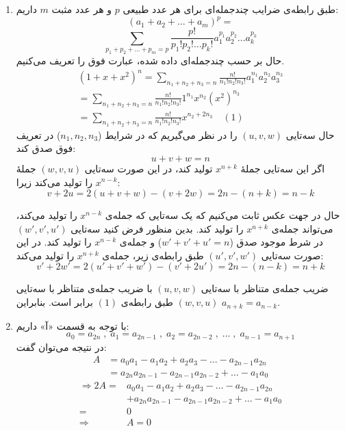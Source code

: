 	\begin{enumerate}
		\item 
        \p
        طبق رابطه‌ی ضرایب چندجمله‌ای برای هر عدد
         طبیعی 
         $p$
         و هر عدد مثبت 
         $m$ 
          داریم:
        $$(a_1+a_2+\ldots+a_m)^p = $$
        $$\sum_{p_1+p_2+\ldots+p_m=p} \frac{p!}{p_1!p_2!\ldots p_k!} a_1^{p_1}a_2^{p_2}\ldots a_k^{p_k}$$
        حال بر حسب چندجمله‌ای داده ‌شده، عبارت فوق را تعریف می‌کنیم.
        \begin{align*}
		(1+x+x^2)^n = \sum_{n_1+n_2+n_3=n} \frac{n!}{n_1!n_2!n_3!} a_1^{n_1} a_2^{n_2} a_3^{n_3}\\
		= \sum_{n_1+n_2+n_3=n} \frac{n!}{n_1!n_2!n_3!} 1^{n_1} x^{n_2} (x^2)^{n_3}\\
		= \sum_{n_1+n_2+n_3=n} \frac{n!}{n_1!n_2!n_3!} x^{n_2 + 2n_3}  \quad (1)
        \end{align*}
		حال سه‌تایی
         $(u , v , w)$
         را در نظر می‌گیریم که در شرایط 
         ($n_1 , n_2 , n_3$)
       در تعریف فوق صدق کند:
       $$u + v + w = n$$
        اگر این سه‌تایی  جملهٔ $x^{n + k}$ تولید کند، در این صورت سه‌تایی $(w , v , u)$ جملهٔ $x^{n - k}$ را تولید می‌کند زیرا:
        $$v + 2u = 2(u + v + w) - (v + 2w) = 2n - (n + k) = n -k$$
        
        \p
        حال در جهت عکس ثابت می‌کنیم که یک سه‌تایی که جمله‌ی
        $x^{n-k}$
        را تولید می‌کند، می‌تواند جمله‌ی
        $x^{n+k}$
        را تولید کند. بدین منظور فرض کنید سه‌تایی
        $(w', v', u')$
        در شرط موجود صدق 
        ($w' + v' + u'=n$)
        و جمله‌ی
        $x^{n-k}$
        را تولید کند.
        در این صورت سه‌تایی
        $(u',v',w')$
        طبق رابطه‌ی زیر، جمله‌ی 
        $x^{n+k}$
        را تولید می‌کند:
    	$$v' + 2w' = 2(u' + v' + w') - (v' + 2u') = 2n - (n - k) = n +k$$
	
        \p
    	 ضریب جمله‌ی متناظر با سه‌تایی 
        $(u , v , w)$ 
        با ضریب جمله‌ی متناظر با سه‌تایی 
        $(w , v , u)$
         طبق رابطه‌ی $(1)$ برابر است. بنابراین 
         $a_{n + k} = a_{n - k}$.
	
	\item
        \p
          با توجه به قسمت  
          «آ»
          داریم:
    	$$a_0 = a_{2n} \; ,\; a_1 = a_{2n - 1}\; ,\; a_2 = a_{2n - 2}\; ,\; \dots \; ,\; a_{n - 1} = a_{n + 1}$$
        در نتیجه می‌توان گفت:
        \begin{align*}
            A &= a_0a_1 - a_1a_2 + a_2a_3 - ... - a_{2n-1}a_{2n} \\
            &= a_{2n}a_{2n-1} - a_{2n-1}a_{2n-2} +\dots - a_1a_0 
        \end{align*}
    	\begin{align*}
    		\Rightarrow 2A = &a_0a_1 - a_1a_2 + a_2a_3 - \dots - a_{2n-1}a_{2n}\\
    		&+ a_{2n}a_{2n-1} - a_{2n-1}a_{2n-2} +\dots - a_1a_0 \\
            = &0\\
    		\Rightarrow &A = 0
    	\end{align*}
	

\end{enumerate}
